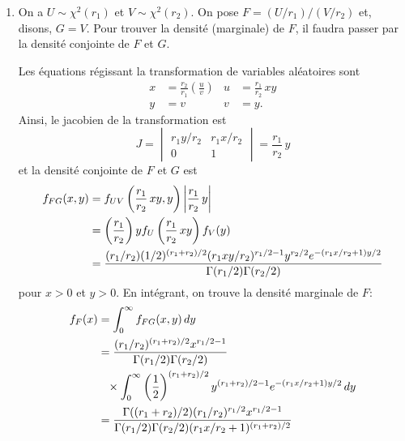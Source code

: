 \begin{solution}{2.13}
    \begin{enumerate}
    \item On a $U \sim \chi^2(r_1)$ et $V \sim \chi^2(r_2)$. On pose
      $F = (U/r_1)/(V/r_2)$ et, disons, $G = V$. Pour trouver la
      densité (marginale) de $F$, il faudra passer par la densité
      conjointe de $F$ et $G$.

      Les équations régissant la transformation de variables
      aléatoires sont
      \begin{align*}
        x &= \frac{r_2}{r_1}\left(\frac{u}{v}\right) &
        u &= \frac{r_1}{r_2}\, x y \\
        y &= v &
        v &= y.
      \end{align*}
      Ainsi, le jacobien de la transformation est
      \begin{displaymath}
        J =
        \begin{vmatrix}
          r_1 y/r_2 & r_1 x/r_2 \\
          0         & 1
        \end{vmatrix}
        = \frac{r_1}{r_2}\, y
      \end{displaymath}
      et la densité conjointe de $F$ et $G$ est
      \begin{align*}
        f_{FG}(x, y)
        &= f_{UV}\left(\frac{r_1}{r_2}\, xy, y\right)
        \left|\frac{r_1}{r_2}\, y\right| \\
        &= \left(\frac{r_1}{r_2}\right) y
        f_U\left(\frac{r_1}{r_2}\, xy\right) f_V(y) \\
        &= \frac{%
          (r_1/r_2)
          (1/2)^{(r_1 + r_2)/2}
          (r_1 xy/r_2)^{r_1/2 - 1}
          y^{r_2/2}
          e^{-(r_1 x/r_2 + 1) y/2}}{%
          \Gamma(r_1/2) \Gamma(r_2/2)}
      \end{align*}
      pour $x > 0$ et $y > 0$. En intégrant, on trouve la densité
      marginale de $F$:
      \begin{align*}
        f_F(x) &= \int_0^{\infty} f_{FG}(x, y)\, dy \\
        &= \frac{(r_1/r_2)^{(r_1 + r_2)/2} x^{r_1/2 - 1}}{%
          \Gamma(r_1/2) \Gamma(r_2/2)} \\
        &\phantom{=} \times
        \int_0^\infty
        \left(\frac{1}{2}\right)^{(r_1 + r_2)/2}
        y^{(r_1 + r_2)/2 - 1}
        e^{-(r_1 x/r_2 + 1) y/2}\, dy \\
        &= \frac{\Gamma((r_1 + r_2)/2) (r_1/r_2)^{r_1/2} x^{r_1/2 - 1}}{%
          \Gamma(r_1/2) \Gamma(r_2/2) (r_1 x/r_2 + 1)^{(r_1 + r_2)/2}} \\

\end{align*}
\end{enumerate}
\end{solution}
